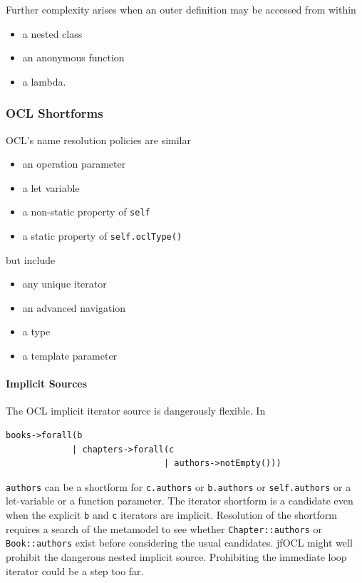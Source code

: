 \documentclass[sigconf]{acmart}
\begin{document}
Further complexity arises when an outer definition may be accessed from within
\begin{itemize}
	\item a nested class
	\item an anonymous function
	\item a lambda.
\end{itemize}

\subsubsection{OCL Shortforms}

OCL's name resolution policies are similar

\begin{itemize}
	\item an operation parameter
	\item a let variable
	\item a non-static property of \texttt{self}
	\item a static property of \texttt{self.oclType()}
\end{itemize}
but include 
\begin{itemize}
	\item any unique iterator
	\item an advanced navigation
	\item a type
	\item a template parameter
\end{itemize}

\paragraph{Implicit Sources}
The OCL implicit iterator source is dangerously flexible. In

\begin{verbatim}
books->forall(b
             | chapters->forall(c
                               | authors->notEmpty()))
\end{verbatim}

\verb|authors| can be a shortform for \verb|c.authors| or \verb|b.authors| or \verb|self.authors| or a let-variable or a function parameter. The iterator shortform is a candidate even when the explicit \verb|b| and \verb|c| iterators are implicit. Resolution of the shortform requires a search of the metamodel to see whether \verb|Chapter::authors| or \verb|Book::authors| exist before considering the usual candidates. jfOCL might well prohibit the dangerous nested implicit source. Prohibiting the immediate loop iterator could be a step too far.  
\end{document}
